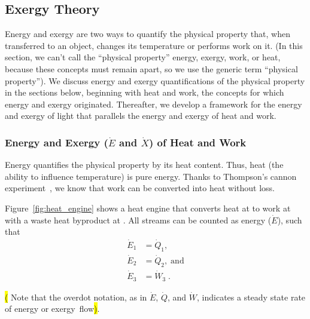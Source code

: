 \documentclass[energies,article,accept,moreauthors,pdftex]{Definitions/mdpi}\usepackage[]{graphicx}\usepackage[]{color}
\newcommand{\enaex}{energy and exergy}
\providecommand{\DIFdelend}{} %
\DeclareRobustCommand{\DIFdelend}{\DIFOaddend \let\includegraphics\DIFOincludegraphics} %
\begin{document}
\DIFdelend %
\subsection{Exergy Theory}
\label{sec:framework}

Energy and exergy are two ways to quantify the physical property that,
when transferred to an object,
changes its temperature or performs work on it.
(In this section, we can't call the ``physical property'' energy, exergy, work, or heat,
because these concepts must remain apart,
so we use the generic term ``physical property'').
We discuss energy and exergy quantifications of the physical property in the sections below, 
beginning with heat and work, 
the concepts for which \enaex{} originated.
Thereafter, we develop a framework for the \enaex{} of light
that parallels the \enaex{} of heat and work.


\subsubsection{Energy and Exergy ($\dot{E}$ and $\dot{X}$) of Heat and Work} 
\label{sec:energy_and_exergy_of_heat_and_work}

Energy quantifies the physical property by its heat content.
Thus, heat (the ability to influence temperature) is pure energy.
Thanks to Thompson's cannon experiment~\cite{Thompson:1798aa}, 
we know that work can be converted into heat without loss.

Figure~\ref{fig:heat_engine} shows a heat engine that converts 
heat at  to 
work at 
with a waste heat byproduct at . 
All streams can be counted as energy ($\dot{E}$), such that 
\begin{align}
  \dot{E}_1 &= \dot{Q}_1, \\
  \dot{E}_2 &= \dot{Q}_2, \; \text{and} \\
  \dot{E}_3 &= \dot{W}_3 \; .
\end{align}

\hl{(} %
Note that the overdot notation, as in $\dot{E}$, $\dot{Q}$, and $\dot{W}$,
indicates a steady state rate of energy or \mbox{exergy flow\hl{)}.}
\end{document}
